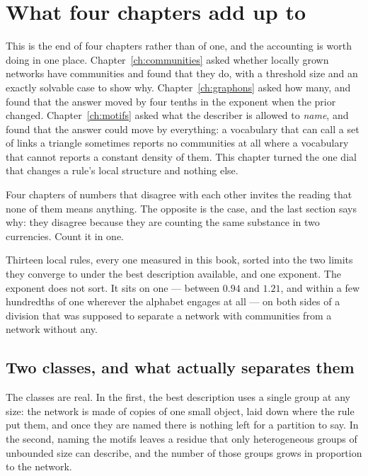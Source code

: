 \section{What four chapters add up to}
\label{sec:bb-conclusion}

This is the end of four chapters rather than of one, and the accounting is worth
doing in one place. Chapter~\ref{ch:communities} asked whether locally grown
networks have communities and found that they do, with a threshold size and an
exactly solvable case to show why. Chapter~\ref{ch:graphons} asked how many, and
found that the answer moved by four tenths in the exponent when the prior
changed. Chapter~\ref{ch:motifs} asked what the describer is allowed to
\emph{name}, and found that the answer could move by everything: a vocabulary
that can call a set of links a triangle sometimes reports no communities at all
where a vocabulary that cannot reports a constant density of them. This chapter
turned the one dial that changes a rule's local structure and nothing else.

Four chapters of numbers that disagree with each other invites the reading that
none of them means anything. The opposite is the case, and the last section says
why: they disagree because they are counting the same substance in two
currencies. Count it in one.



\noindent Thirteen local rules, every one measured in this book, sorted into the
two limits they converge to under the best description available, and one
exponent. The exponent does not sort. It sits on one --- between $0.94$ and
$1.21$, and within a few hundredths of one wherever the alphabet engages at
all --- on both sides of a division that was supposed to separate a network with
communities from a network without any.

\subsection*{Two classes, and what actually separates them}

The classes are real. In the first, the best description uses a single group at
any size: the network is made of copies of one small object, laid down where the
rule put them, and once they are named there is nothing left for a partition to
say. In the second, naming the motifs leaves a residue that only heterogeneous
groups of unbounded size can describe, and the number of those groups grows in
proportion to the network.

